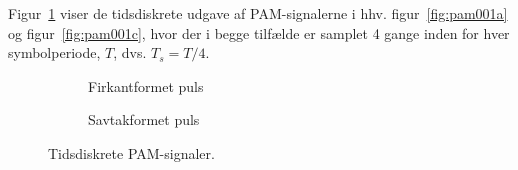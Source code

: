 \documentclass[dvips,11pt,a4paper]{article}
\begin{document}
\noindent{}Figur~\ref{fig:pam001bd} viser de tidsdiskrete udgave af PAM-signalerne i hhv. figur~\ref{fig:pam001a} og figur~\ref{fig:pam001c}, hvor der i begge tilfælde er samplet 4 gange inden for hver symbolperiode, $T$, dvs. $T_s = T/4$.
\begin{figure}[htbp]
\centering
\begin{subfigure}[b]{0.48\textwidth}
\centering{}
\caption{Firkantformet puls}
\end{subfigure}
\begin{subfigure}[b]{0.48\textwidth}
\centering{}
\caption{Savtakformet puls}
\end{subfigure}
\caption{\label{fig:pam001bd}Tidsdiskrete PAM-signaler.}
\end{figure}
\end{document}
